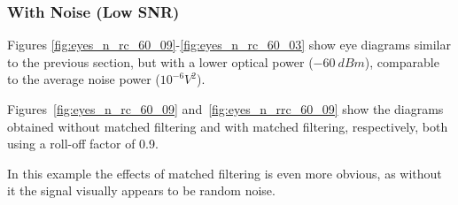 \begin{refsection}
\subsubsection{With Noise (Low SNR)}
Figures \ref{fig:eyes_n_rc_60_09}-\ref {fig:eyes_n_rc_60_03} show eye
diagrams similar to the previous section, but with a lower optical power ($-60~dBm$),
comparable to the average noise power ($10^{-6} V^2$).



Figures~\ref{fig:eyes_n_rc_60_09} and~\ref{fig:eyes_n_rrc_60_09} show the
diagrams obtained without matched filtering and with matched filtering,
respectively, both using a roll-off factor of 0.9.

In this example the effects of matched filtering is even more obvious, as
without it the signal visually appears to be random noise.
\begin{table}[H]
	\centering
	

\end{table}
\end{refsection}
